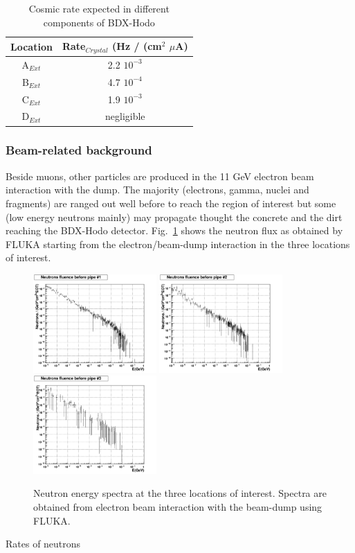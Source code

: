 \begin{table}[htp]
\caption{Cosmic rate expected in different components of BDX-Hodo}
\begin{center}
\begin{tabular}{|c|c|}
\hline
Location &Rate$_{Crystal} $ (Hz / (cm$^2$ $\mu$A) \\
\hline\hline
A$_{Ext} $ & 2.2 $10^{-3}$\\
 \hline
B$_{Ext} $ & 4.7 $10^{-4}$\\
 \hline
C$_{Ext} $ & 1.9 $10^{-3}$\\
 \hline
D$_{Ext}$ & negligible\\

\hline\hline
\end{tabular}
\end{center}
\label{tab:outside}
\end{table}%




\subsubsection{Beam-related background}
Beside muons, other particles are produced in the 11 GeV electron beam interaction with the dump.
The majority (electrons, gamma, nuclei and fragments) are ranged out well before to reach the region of interest but some (low energy neutrons mainly) may propagate thought the concrete and the dirt reaching the BDX-Hodo detector.
Fig.~\ref{fig:nu-comp} shows the neutron flux  as obtained by  FLUKA starting from the electron/beam-dump interaction  in the  three locations of interest. 
\begin{figure}[h!] 
\center
\includegraphics[width=4.7cm]{figs/NeutronsPipe1_1D.pdf}
\includegraphics[width=4.7cm]{figs/NeutronsPipe2_1D.pdf}
\includegraphics[width=4.7cm]{figs/NeutronsPipe3_1D.pdf}
\caption {Neutron energy spectra at the three locations of interest. Spectra are obtained from electron beam interaction with the beam-dump using FLUKA.}
\label{fig:nu-comp}
\end{figure}
Rates of neutrons 

